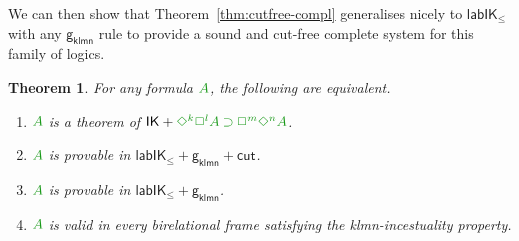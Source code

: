 \documentclass[a4paper]{article}
\theoremstyle{plain}
\newtheorem{theorem}{Theorem}[section]
\theoremstyle{definition}
\newcommand*{\IK}{\mathsf{IK}}
\newcommand*{\labIKp}{\lab\IK_{\le}}
\newcommand*{\IMP}{\mathbin{\supset}}%
\newcommand*{\BOX}{\mathord{\Box}}
\newcommand*{\DIA}{\mathord{\Diamond}}
\newcommand*{\fm}[1]{{\color{notgreen}{#1}}}
\newcommand*{\rn}[1]  {\ensuremath{\mathsf{#1}}}
\newcommand*{\lab}{\mathsf{lab}}
\newcommand*{\labrn}[2][]  {\rn{#2}_{#1}}%
\newcommand{\gklmn}{{\mathsf{g_{klmn}}}}%
\begin{document}
%

We can then show that Theorem~\ref{thm:cutfree-compl} generalises nicely to $\labIKp$ with any $\gklmn$ rule to provide a sound and cut-free complete system for this family of logics.

\begin{theorem}\label{thm:cutfree-compl-gklmn}
	For any formula $\fm A$, the following are equivalent.
	\begin{enumerate}
		\item\label{1} $\fm A$ is a theorem of $\IK + \fm{\DIA^k\BOX^l A \IMP \BOX^m\DIA^n A}$. 
		\item\label{2} $\fm A$ is provable in $\labIKp + \gklmn +\labrn{cut}$.
		\item\label{3} $\fm A$ is provable in $\labIKp + \gklmn $.
		\item\label{4} $\fm A$ is valid in every birelational frame satisfying the klmn-incestuality property.
	\end{enumerate}
\end{theorem}
\end{document}

